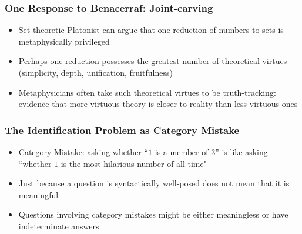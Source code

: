 \begin{frame}
\frametitle{One Response to Benacerraf: Joint-carving}


\begin{itemize}[<+->]

\item Set-theoretic Platonist can argue that one reduction of numbers to sets is metaphysically privileged

\item Perhaps one reduction possesses the greatest number of theoretical virtues (simplicity, depth, unification, fruitfulness)

\item Metaphysicians often take such theoretical virtues to be truth-tracking: evidence that more virtuous theory is closer to reality than less virtuous ones

\end{itemize}
\end{frame}

\begin{frame}
\frametitle{The Identification Problem as Category Mistake}

\begin{itemize}[<+->]

\item Category Mistake: asking whether ``$1$ is a member of $3$'' is like asking ``whether $1$ is the most hilarious number of all time"

\item Just because a question is syntactically well-posed does not mean that it is meaningful

\item Questions involving category mistakes might be either meaningless or have indeterminate answers

\end{itemize}
\end{frame}

